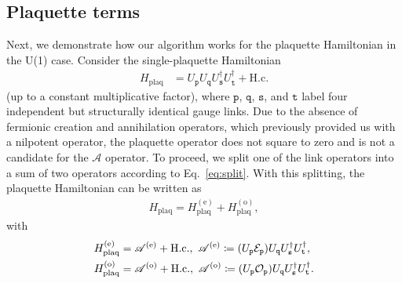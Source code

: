 \documentclass[aps,prd,twocolumn,showpacs,groupedaddress,superscriptaddress,nofootinbib,floatfix,preprintnumbers,longbibliography]{revtex4-1}
\begin{document}
\subsection{Plaquette terms}
Next, we demonstrate how our algorithm works for the plaquette Hamiltonian in the U(1) case. Consider the single-plaquette Hamiltonian
%
\begin{align}
    H_{\mathrm{plaq}} &= U_\mathtt{p} U_\mathtt{q} U_\mathtt{s}^\dagger U_\mathtt{t}^\dagger + \mathrm{H.c.} 
    \label{eq:U(1)-plaq}
\end{align}
%
(up to a constant multiplicative factor), where $\mathtt{p}$, $\mathtt{q}$, $\mathtt{s}$, and $\mathtt{t}$ label four independent but structurally identical gauge links. Due to the absence of fermionic creation and annihilation operators, which previously provided us with a nilpotent operator, the plaquette operator does not square to zero and is not a candidate for the $\mathscr{A}$ operator. To proceed, we split one of the link operators into a sum of two operators according to Eq.~\eqref{eq:split}. With this splitting, the plaquette Hamiltonian can be written as
%
\begin{eqnarray}
     H_{\mathrm{plaq}}=H_{\mathrm{plaq}}^{(\text{e})}+H_{\mathrm{plaq}}^{(\text{o})},
     \label{eq:even-odd-H}
\end{eqnarray}
%
with
%
\begin{subequations}
\begin{align}
     &H_{\mathrm{plaq}}^{(\text{e})} = \mathscr{A}^{(\text{e})} + {\rm H.c.}, ~ \mathscr{A}^{(\text{e})}  \coloneq
     ( U_\mathtt{p} \mathcal{E}_\mathtt{p}) U_\mathtt{q} U_\mathtt{s}^\dagger U_\mathtt{t}^\dagger ,
     \label{eq:Hplaqe}
     \\
     &H_{\mathrm{plaq}}^{(\text{o})} = \mathscr{A}^{(\text{o})} + {\rm H.c.}, ~ \mathscr{A}^{(\text{o})} \coloneq
     (U_\mathtt{p}\mathcal{O}_\mathtt{p}) U_\mathtt{q} U_\mathtt{s}^\dagger U_\mathtt{t}^\dagger.
     \label{eq:Hplaqo}
\end{align}
\end{subequations}
%
\end{document}
